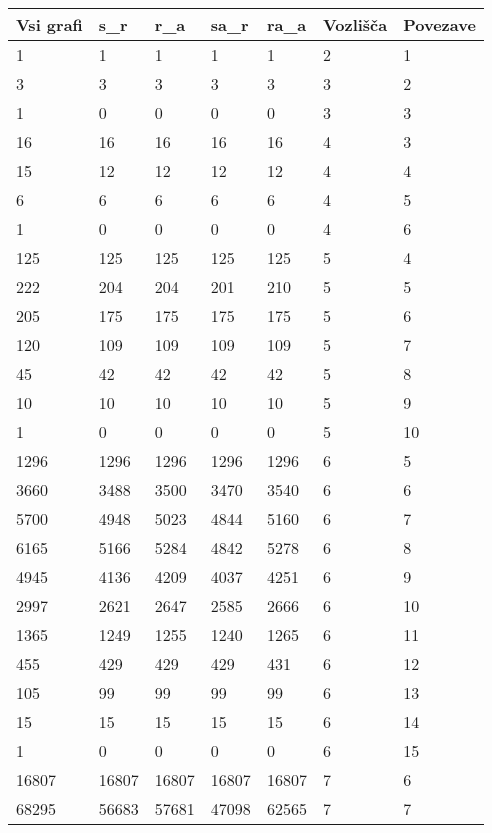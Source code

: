 \documentclass[fin1, tisk]{fmfdelo}
\begin{document}
\begin{table}[h]
    \centering
    \scriptsize
    \begin{tabular}{|l|l|l|l|l|l|l|}
    \hline
        Vsi grafi & s\_r & r\_a & sa\_r & ra\_a & Vozlišča & Povezave \\ 
        \hline
        1 & 1 & 1 & 1 & 1 & 2 & 1 \\ 
        3 & 3 & 3 & 3 & 3 & 3 & 2 \\ 
        1 & 0 & 0 & 0 & 0 & 3 & 3 \\ 
        16 & 16 & 16 & 16 & 16 & 4 & 3 \\ 
        15 & 12 & 12 & 12 & 12 & 4 & 4 \\ 
        6 & 6 & 6 & 6 & 6 & 4 & 5 \\ 
        1 & 0 & 0 & 0 & 0 & 4 & 6 \\ 
        125 & 125 & 125 & 125 & 125 & 5 & 4 \\ 
        222 & 204 & 204 & 201 & 210 & 5 & 5 \\ 
        205 & 175 & 175 & 175 & 175 & 5 & 6 \\ 
        120 & 109 & 109 & 109 & 109 & 5 & 7 \\ 
        45 & 42 & 42 & 42 & 42 & 5 & 8 \\ 
        10 & 10 & 10 & 10 & 10 & 5 & 9 \\ 
        1 & 0 & 0 & 0 & 0 & 5 & 10 \\ 
        1296 & 1296 & 1296 & 1296 & 1296 & 6 & 5 \\ 
        3660 & 3488 & 3500 & 3470 & 3540 & 6 & 6 \\ 
        5700 & 4948 & 5023 & 4844 & 5160 & 6 & 7 \\ 
        6165 & 5166 & 5284 & 4842 & 5278 & 6 & 8 \\ 
        4945 & 4136 & 4209 & 4037 & 4251 & 6 & 9 \\ 
        2997 & 2621 & 2647 & 2585 & 2666 & 6 & 10 \\ 
        1365 & 1249 & 1255 & 1240 & 1265 & 6 & 11 \\ 
        455 & 429 & 429 & 429 & 431 & 6 & 12 \\ 
        105 & 99 & 99 & 99 & 99 & 6 & 13 \\ 
        15 & 15 & 15 & 15 & 15 & 6 & 14 \\ 
        1 & 0 & 0 & 0 & 0 & 6 & 15 \\ 
        16807 & 16807 & 16807 & 16807 & 16807 & 7 & 6 \\ 
        68295 & 56683 & 57681 & 47098 & 62565 & 7 & 7 \\ 

\end{tabular}
\end{table}
\end{document}
